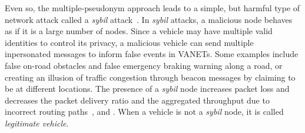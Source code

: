 \documentclass[preprint,12pt]{elsarticle}
\begin{document}
Even so, the multiple-pseudonym approach leads to a simple, but harmful type of network attack called a \textit{sybil} attack~\cite{sybil}. In \textit{sybil} attacks, a malicious node behaves as if it is a large number of nodes. Since a vehicle may have multiple valid identities to control its privacy, a malicious vehicle can send multiple inpersonated messages to inform false events in VANETs. Some examples include false on-road obstacles and false emergency braking warning along a road, or creating an illusion of traffic congestion through beacon messages by claiming to be at different locations. The presence of a \textit{sybil} node increases packet loss and decreases the packet delivery ratio and the aggregated throughput due to incorrect routing paths~\cite{sybil-impact3}, \cite{sybil-impact2} and \cite{sybil-attack-impact-routing1}. When a vehicle is not a \textit{sybil} node, it is called \textit{legitimate vehicle}.

%


\end{document}
